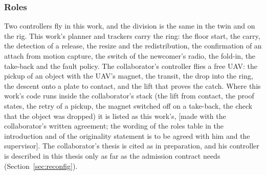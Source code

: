 \subsubsection{Roles}
\label{sec:roles}

Two controllers fly in this work, and the division is the same in the twin and on the rig. This work's planner and
trackers carry the ring: the floor start, the carry, the detection of a release, the resize and the redistribution,
the confirmation of an attach from motion capture, the switch of the newcomer's radio, the fold-in, the take-back
and the fault policy. The collaborator's controller flies a free UAV: the pickup of an object with the UAV's
magnet, the transit, the drop into the ring, the descent onto a plate to contact, and the lift that proves the
catch. Where this work's code runs inside the collaborator's stack (the lift from contact, the proof states, the
retry of a pickup, the magnet switched off on a take-back, the check that the object was dropped) it is listed as
this work's, [made with the collaborator's written agreement; the wording of the roles table in the introduction
and of the originality statement is to be agreed with him and the supervisor]. The collaborator's thesis is cited as
in preparation, and his controller is described in this thesis only as far as the admission contract needs
(Section~\ref{sec:reconfig}).
